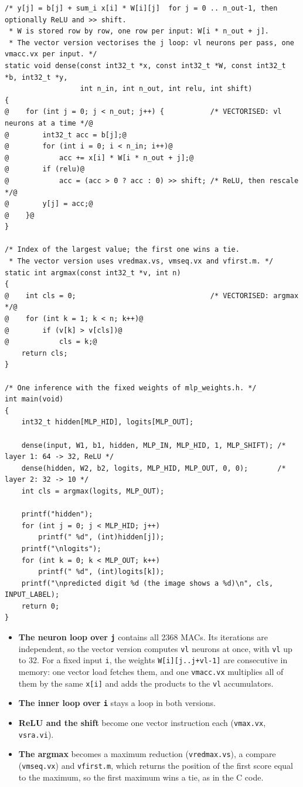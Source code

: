 \documentclass[11pt,a4paper]{article}
\newcommand{\code}[1]{\texttt{#1}}
\begin{document}
\begin{lstlisting}[style=c]
/* y[j] = b[j] + sum_i x[i] * W[i][j]  for j = 0 .. n_out-1, then optionally ReLU and >> shift.
 * W is stored row by row, one row per input: W[i * n_out + j].
 * The vector version vectorises the j loop: vl neurons per pass, one vmacc.vx per input. */
static void dense(const int32_t *x, const int32_t *W, const int32_t *b, int32_t *y,
                  int n_in, int n_out, int relu, int shift)
{
@    for (int j = 0; j < n_out; j++) {           /* VECTORISED: vl neurons at a time */@
@        int32_t acc = b[j];@
@        for (int i = 0; i < n_in; i++)@
@            acc += x[i] * W[i * n_out + j];@
@        if (relu)@
@            acc = (acc > 0 ? acc : 0) >> shift; /* ReLU, then rescale */@
@        y[j] = acc;@
@    }@
}

/* Index of the largest value; the first one wins a tie.
 * The vector version uses vredmax.vs, vmseq.vx and vfirst.m. */
static int argmax(const int32_t *v, int n)
{
@    int cls = 0;                                /* VECTORISED: argmax */@
@    for (int k = 1; k < n; k++)@
@        if (v[k] > v[cls])@
@            cls = k;@
    return cls;
}

/* One inference with the fixed weights of mlp_weights.h. */
int main(void)
{
    int32_t hidden[MLP_HID], logits[MLP_OUT];

    dense(input, W1, b1, hidden, MLP_IN, MLP_HID, 1, MLP_SHIFT); /* layer 1: 64 -> 32, ReLU */
    dense(hidden, W2, b2, logits, MLP_HID, MLP_OUT, 0, 0);       /* layer 2: 32 -> 10 */
    int cls = argmax(logits, MLP_OUT);

    printf("hidden");
    for (int j = 0; j < MLP_HID; j++)
        printf(" %d", (int)hidden[j]);
    printf("\nlogits");
    for (int k = 0; k < MLP_OUT; k++)
        printf(" %d", (int)logits[k]);
    printf("\npredicted digit %d (the image shows a %d)\n", cls, INPUT_LABEL);
    return 0;
}
\end{lstlisting}

\begin{itemize}
  \item \textbf{The neuron loop over \code{j}} contains all 2368 MACs. Its iterations are
        independent, so the vector version computes \code{vl} neurons at once, with \code{vl} up
        to 32. For a fixed input \code{i}, the weights \code{W[i][j..j+vl-1]} are consecutive in
        memory: one vector load fetches them, and one \code{vmacc.vx} multiplies all of them by
        the same \code{x[i]} and adds the products to the \code{vl} accumulators.
  \item \textbf{The inner loop over \code{i}} stays a loop in both versions.
  \item \textbf{ReLU and the shift} become one vector instruction each (\code{vmax.vx},
        \code{vsra.vi}).
  \item \textbf{The argmax} becomes a maximum reduction (\code{vredmax.vs}), a compare
        (\code{vmseq.vx}) and \code{vfirst.m}, which returns the position of the first score equal
        to the maximum, so the first maximum wins a tie, as in the C code.
\end{itemize}
\end{document}
